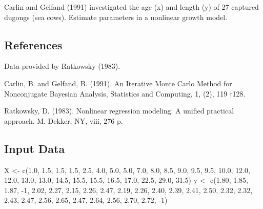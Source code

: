 \documentclass[
  letterpaper,
  DIV=11,
  numbers=noendperiod]{scrreprt}
\newenvironment{Shaded}{\begin{snugshade}}{\end{snugshade}}
\newcommand{\DecValTok}[1]{\textcolor[rgb]{0.68,0.00,0.00}{#1}}
\newcommand{\FloatTok}[1]{\textcolor[rgb]{0.68,0.00,0.00}{#1}}
\newcommand{\FunctionTok}[1]{\textcolor[rgb]{0.28,0.35,0.67}{#1}}
\newcommand{\NormalTok}[1]{\textcolor[rgb]{0.00,0.23,0.31}{#1}}
\newcommand{\OtherTok}[1]{\textcolor[rgb]{0.00,0.23,0.31}{#1}}
\newcommand{\SpecialCharTok}[1]{\textcolor[rgb]{0.37,0.37,0.37}{#1}}
\begin{document}

Carlin and Gelfand (1991) investigated the age (x) and length (y) of 27
captured dugongs (sea cows). Estimate parameters in a nonlinear growth
model.

\hypertarget{references}{%
\subsection*{References}\label{references}}

Data provided by Ratkowsky (1983).

Carlin, B. and Gelfand, B. (1991). An Iterative Monte Carlo Method for
Nonconjugate Bayesian Analysis, Statistics and Computing, 1, (2),
119†128.

Ratkowsky, D. (1983). Nonlinear regression modeling: A unified practical
approach. M. Dekker, NY, viii, 276 p.

\hypertarget{input-data}{%
\subsection*{Input Data}\label{input-data}}

\begin{Shaded}
\begin{Highlighting}[]
\NormalTok{X }\OtherTok{\textless{}{-}} \FunctionTok{c}\NormalTok{(}\FloatTok{1.0}\NormalTok{, }\FloatTok{1.5}\NormalTok{, }\FloatTok{1.5}\NormalTok{, }\FloatTok{1.5}\NormalTok{, }\FloatTok{2.5}\NormalTok{, }\FloatTok{4.0}\NormalTok{, }\FloatTok{5.0}\NormalTok{, }\FloatTok{5.0}\NormalTok{, }\FloatTok{7.0}\NormalTok{, }\FloatTok{8.0}\NormalTok{, }\FloatTok{8.5}\NormalTok{, }\FloatTok{9.0}\NormalTok{, }\FloatTok{9.5}\NormalTok{, }
     \FloatTok{9.5}\NormalTok{, }\FloatTok{10.0}\NormalTok{, }\FloatTok{12.0}\NormalTok{, }\FloatTok{12.0}\NormalTok{, }\FloatTok{13.0}\NormalTok{, }\FloatTok{13.0}\NormalTok{, }\FloatTok{14.5}\NormalTok{, }\FloatTok{15.5}\NormalTok{, }\FloatTok{15.5}\NormalTok{, }\FloatTok{16.5}\NormalTok{, }\FloatTok{17.0}\NormalTok{,}
     \FloatTok{22.5}\NormalTok{, }\FloatTok{29.0}\NormalTok{, }\FloatTok{31.5}\NormalTok{)}
\NormalTok{y }\OtherTok{\textless{}{-}} \FunctionTok{c}\NormalTok{(}\FloatTok{1.80}\NormalTok{, }\FloatTok{1.85}\NormalTok{, }\FloatTok{1.87}\NormalTok{, }\SpecialCharTok{{-}}\DecValTok{1}\NormalTok{, }\FloatTok{2.02}\NormalTok{, }\FloatTok{2.27}\NormalTok{, }\FloatTok{2.15}\NormalTok{, }\FloatTok{2.26}\NormalTok{, }\FloatTok{2.47}\NormalTok{, }\FloatTok{2.19}\NormalTok{, }\FloatTok{2.26}\NormalTok{,}
     \FloatTok{2.40}\NormalTok{, }\FloatTok{2.39}\NormalTok{, }\FloatTok{2.41}\NormalTok{, }\FloatTok{2.50}\NormalTok{, }\FloatTok{2.32}\NormalTok{, }\FloatTok{2.32}\NormalTok{, }\FloatTok{2.43}\NormalTok{, }\FloatTok{2.47}\NormalTok{, }\FloatTok{2.56}\NormalTok{, }\FloatTok{2.65}\NormalTok{, }\FloatTok{2.47}\NormalTok{,}
     \FloatTok{2.64}\NormalTok{, }\FloatTok{2.56}\NormalTok{, }\FloatTok{2.70}\NormalTok{, }\FloatTok{2.72}\NormalTok{, }\SpecialCharTok{{-}}\DecValTok{1}\NormalTok{)}
\end{Highlighting}
\end{Shaded}
\end{document}
